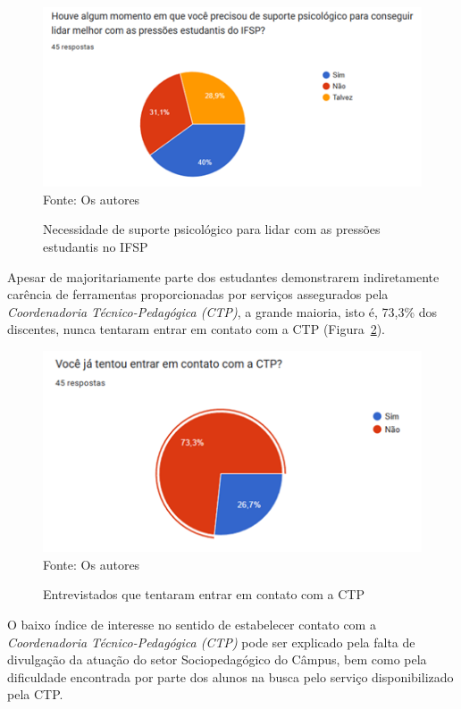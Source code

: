 \documentclass[12pt,a4paper]{article}
\begin{document}
\begin{figure}[H]
    \centering
    \caption{Necessidade de suporte psicológico para lidar com as pressões estudantis no IFSP}
    \includegraphics[width=14cm]{img2.png} \\
    Fonte: Os autores
    \label{fig02}
\end{figure}

Apesar de majoritariamente parte dos estudantes demonstrarem indiretamente carência de ferramentas proporcionadas por serviços assegurados pela \textit{Coordenadoria Técnico-Pedagógica (CTP)}, a grande maioria, isto é, 73,3\% dos discentes, nunca tentaram entrar em contato com a \ac{CTP} (Figura~\ref{fig03}).

\begin{figure}[H]
    \centering
    \caption{Entrevistados que tentaram entrar em contato com a CTP}
    \includegraphics[width=12cm]{img3.png} \\
    Fonte: Os autores
    \label{fig03}
\end{figure}

O baixo índice de interesse no sentido de estabelecer contato com a \textit{Coordenadoria Técnico-Pedagógica (CTP)} pode ser explicado pela falta de divulgação da atuação do setor Sociopedagógico do Câmpus, bem como pela dificuldade encontrada por parte dos alunos na busca pelo serviço disponibilizado pela \ac{CTP}.
\end{document}
